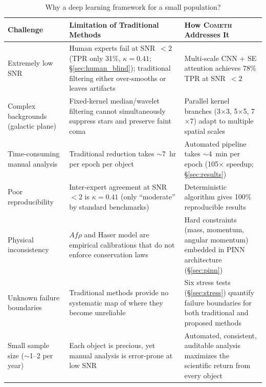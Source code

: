 \documentclass[usenatbib]{mnras}
\begin{document}
\begin{table}
\centering
\caption{Why a deep learning framework for a small population?}\label{tab:necessity}
\begin{tabular}{p{3.2cm}p{5.5cm}p{5.5cm}}
\toprule
Challenge & Limitation of Traditional Methods & How \textsc{Cometh} Addresses It \\
\midrule
Extremely low SNR & Human experts fail at SNR~$<2$ (TPR only 31\%, $\kappa = 0.41$; \S\ref{sec:human_blind}); traditional filtering either over-smooths or leaves artifacts & Multi-scale CNN + SE attention achieves 78\% TPR at SNR~$<2$ \\
Complex backgrounds (galactic plane) & Fixed-kernel median/wavelet filtering cannot simultaneously suppress stars and preserve faint coma & Parallel kernel branches (3$\times$3, 5$\times$5, 7$\times$7) adapt to multiple spatial scales \\
Time-consuming manual analysis & Traditional reduction takes $\sim$7~hr per epoch per object & Automated pipeline takes $\sim$4~min per epoch (105$\times$ speedup; \S\ref{sec:results}) \\
Poor reproducibility & Inter-expert agreement at SNR~$<2$ is $\kappa = 0.41$ (only ``moderate'' by standard benchmarks) & Deterministic algorithm gives 100\% reproducible results \\
Physical inconsistency & $Af\rho$ and Haser model are empirical calibrations that do not enforce conservation laws & Hard constraints (mass, momentum, angular momentum) embedded in PINN architecture (\S\ref{sec:pinn}) \\
Unknown failure boundaries & Traditional methods provide no systematic map of where they become unreliable & Six stress tests (\S\ref{sec:stress}) quantify failure boundaries for both traditional and proposed methods \\
Small sample size ($\sim$1--2 per year) & Each object is precious, yet manual analysis is error-prone at low SNR & Automated, consistent, auditable analysis maximizes the scientific return from every object \\
\bottomrule
\end{tabular}
\end{table}
\end{document}
